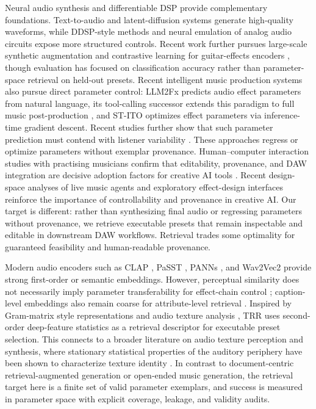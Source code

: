 Neural audio synthesis and differentiable DSP provide complementary foundations. Text-to-audio and latent-diffusion systems \citep{liu2023audioldm,agostinelli2023musiclm,liu2024audioldm2} generate high-quality waveforms, while DDSP-style methods \citep{engel2020ddsp,peladeau2024blind,liu2024ddspSFX} and neural emulation of analog audio circuits \citep{wright2020realtime} expose more structured controls. Recent work further pursues large-scale synthetic augmentation and contrastive learning for guitar-effects encoders \citep{wright2024openamp}, though evaluation has focused on classification accuracy rather than parameter-space retrieval on held-out presets. Recent intelligent music production systems also pursue direct parameter control: LLM2Fx \citep{doh2025llm2fx} predicts audio effect parameters from natural language, its tool-calling successor extends this paradigm to full music post-production \citep{doh2025llm2fxtools}, and ST-ITO \citep{benetos2024stito} optimizes effect parameters via inference-time gradient descent. Recent studies further show that such parameter prediction must contend with listener variability \citep{stylianou2026oneprompt}. These approaches regress or optimize parameters without exemplar provenance. Human--computer interaction studies with practising musicians confirm that editability, provenance, and DAW integration are decisive adoption factors for creative AI tools \citep{fiebrink2009wekinator,krol2025codesign,tchemeube2023mmmc}. Recent design-space analyses of live music agents \citep{kim2026designspace} and exploratory effect-design interfaces \citep{chu2026fxplorer} reinforce the importance of controllability and provenance in creative AI. Our target is different: rather than synthesizing final audio or regressing parameters without provenance, we retrieve executable presets that remain inspectable and editable in downstream DAW workflows. Retrieval trades some optimality for guaranteed feasibility and human-readable provenance.

Modern audio encoders such as CLAP \citep{elizalde2023clap}, PaSST \citep{koutini2022passt}, PANNs \citep{kong2020panns}, and Wav2Vec2 \citep{baevski2020wav2vec} provide strong first-order or semantic embeddings. However, perceptual similarity does not necessarily imply parameter transferability for effect-chain control \citep{deng2025timbre}; caption-level embeddings also remain coarse for attribute-level retrieval \citep{anand2026figma}. Inspired by Gram-matrix style representations \citep{gatys2015style,ulyanov2016audio} and audio texture analysis \citep{bruna2013audio,mcwec2023texture}, TRR uses second-order deep-feature statistics as a retrieval descriptor for executable preset selection. This connects to a broader literature on audio texture perception and synthesis, where stationary statistical properties of the auditory periphery have been shown to characterize texture identity \citep{mcdermott2011sound}. In contrast to document-centric retrieval-augmented generation \citep{lewis2020rag} or open-ended music generation, the retrieval target here is a finite set of valid parameter exemplars, and success is measured in parameter space with explicit coverage, leakage, and validity audits.

